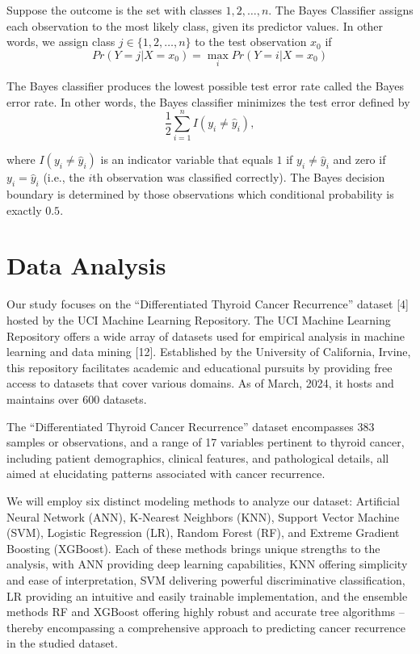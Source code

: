 \documentclass[
  letterpaper,
  DIV=11,
  numbers=noendperiod]{scrartcl}
\begin{document}
Suppose the outcome is the set with classes \(1, 2, \dots, n\). The
Bayes Classifier assigns each observation to the most likely class,
given its predictor values. In other words, we assign class
\(j \in \{1, 2, \dots, n\}\) to the test observation \(x_0\) if
\[Pr(Y = j | X = x_0) = \max_{i} Pr(Y = i | X = x_0)\]

The Bayes classifier produces the lowest possible test error rate called
the Bayes error rate. In other words, the Bayes classifier minimizes the
test error defined by
\[\frac{1}{2} \sum_{i = 1}^{n} I(y_i \neq \hat{y}_i),\]

where \(I(y_i \neq \hat{y}_i)\) is an indicator variable that equals
\(1\) if \(y_i \neq \hat{y}_i\) and zero if \(y_i = \hat{y}_i\) (i.e.,
the \(i\)th observation was classified correctly). The Bayes decision
boundary is determined by those observations which conditional
probability is exactly \(0.5\).

\section{Data Analysis}\label{data-analysis}

Our study focuses on the ``Differentiated Thyroid Cancer Recurrence''
dataset {[}4{]} hosted by the UCI Machine Learning Repository. The UCI
Machine Learning Repository offers a wide array of datasets used for
empirical analysis in machine learning and data mining {[}12{]}.
Established by the University of California, Irvine, this repository
facilitates academic and educational pursuits by providing free access
to datasets that cover various domains. As of March, 2024, it hosts and
maintains over 600 datasets.

The ``Differentiated Thyroid Cancer Recurrence'' dataset encompasses 383
samples or observations, and a range of 17 variables pertinent to
thyroid cancer, including patient demographics, clinical features, and
pathological details, all aimed at elucidating patterns associated with
cancer recurrence.

We will employ six distinct modeling methods to analyze our dataset:
Artificial Neural Network (ANN), K-Nearest Neighbors (KNN), Support
Vector Machine (SVM), Logistic Regression (LR), Random Forest (RF), and
Extreme Gradient Boosting (XGBoost). Each of these methods brings unique
strengths to the analysis, with ANN providing deep learning
capabilities, KNN offering simplicity and ease of interpretation, SVM
delivering powerful discriminative classification, LR providing an
intuitive and easily trainable implementation, and the ensemble methods
RF and XGBoost offering highly robust and accurate tree algorithms --
thereby encompassing a comprehensive approach to predicting cancer
recurrence in the studied dataset.
\end{document}
